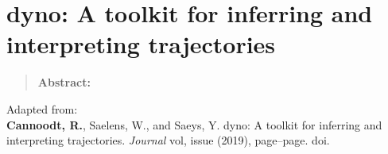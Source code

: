 \newpage{\thispagestyle{empty}\cleardoublepage}
\chapter{dyno: A toolkit for inferring and interpreting trajectories} 
\label{chap:dyno}

\begin{quote}
	\textbf{Abstract:} \blindtext
\end{quote}

\vfill

Adapted from:\\
\textbf{Cannoodt, R.}, Saelens, W., and Saeys, Y. dyno: A toolkit for inferring and interpreting trajectories. \textit{Journal} vol, issue (2019), page--page. doi.
\newpage

\blindtext